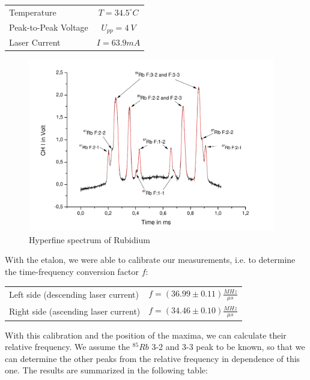 \begin{center}
\begin{tabular}[H]{l c}
Temperature & $T=34.5 ^\circ C$\\
Peak-to-Peak Voltage & $U_{pp} = 4\ V$\\
Laser Current & $I = 63.9 mA$\\
\end{tabular}
\end{center}

\begin{figure}[H]
\centering \includegraphics[width=0.96\textwidth]{BilderAusw/HFS.pdf}
\caption{Hyperfine spectrum of Rubidium}
\end{figure}

With the etalon, we were able to calibrate our measurements, i.e. to determine the time-frequency conversion factor $f$:

\begin{center}
\begin{tabular}[H]{l l}
Left side (descending laser current) & $f = (36.99 \pm 0.11) \frac{MHz}{\mu s}$\\
Right side (ascending laser current) &  $ f = (34.46 \pm 0.10) \frac{MHz}{\mu s}$\\ 
\end{tabular}
\end{center}

With this calibration and the position of the maxima, we can calculate their relative frequency. We assume the $^{85}Rb$ 3-2 and 3-3 peak to be known, so that we can determine the other peaks from the relative frequency in dependence of this one. The results are summarized in the following table:

